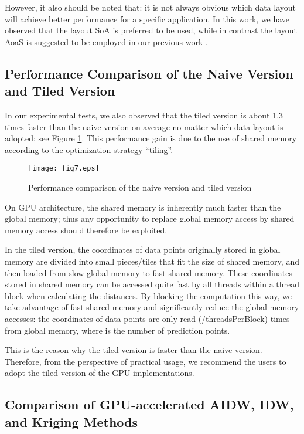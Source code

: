 \documentclass[fleqn,11pt]{wlscirep}
\begin{document}
However, it also should be noted that: it is not always obvious which data 
layout will achieve better performance for a specific application. In this 
work, we have observed that the layout SoA is preferred to be used, while in 
contrast the layout AoaS is suggested to be employed in our previous work \cite{31}.


\subsection{Performance Comparison of the Naive Version and Tiled Version}

In our experimental tests, we also observed that the tiled version is about 
1.3 times faster than the naive version on average no matter which data 
layout is adopted; see Figure \ref{fig7:naive vs tiled}. This performance gain is due to the use of 
shared memory according to the optimization strategy ``tiling''. 

\begin{figure}[ht]
	\centering
	\texttt{[image: fig7.eps]}
	\caption{Performance comparison of the naive version and tiled version}
	\label{fig7:naive vs tiled}
\end{figure}


On GPU architecture, the shared memory is inherently much faster than the 
global memory; thus any opportunity to replace global memory access by 
shared memory access should therefore be exploited. 

In the tiled version, the coordinates of data points originally stored in 
global memory are divided into small pieces/tiles that fit the size of 
shared memory, and then loaded from slow global memory to fast shared 
memory. These coordinates stored in shared memory can be accessed quite fast 
by all threads within a thread block when calculating the distances. By 
blocking the computation this way, we take advantage of fast shared memory 
and significantly reduce the global memory accesses: the coordinates of data 
points are only read (/threadsPerBlock) times from global memory, where 
 is the number of prediction points.

This is the reason why the tiled version is faster than the naive version. 
Therefore, from the perspective of practical usage, we recommend the users 
to adopt the tiled version of the GPU implementations.


\subsection{Comparison of GPU-accelerated AIDW, IDW, and Kriging Methods}
\end{document}
